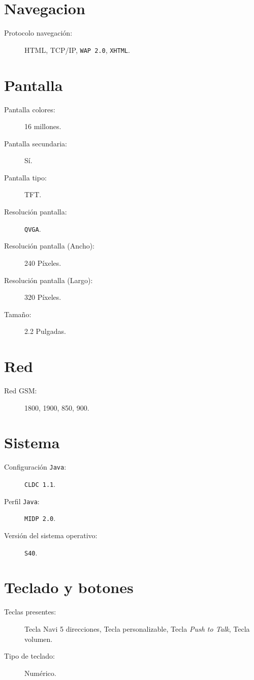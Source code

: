 \section{Navegacion}
\begin{description}
\item[Protocolo navegación:] \acs{HTML}, \acs{TCP}/\acs{IP},
\texttt{WAP 2.0}, \texttt{XHTML}.
\end{description}
\section{Pantalla}
\begin{description}
\item[Pantalla colores:] 16 millones.
\item[Pantalla secundaria:] Sí.
\item[Pantalla tipo:] \acs{TFT}.
\item[Resolución pantalla:] \texttt{QVGA}.
\item[Resolución pantalla (Ancho):] 240 Píxeles.
\item[Resolución pantalla (Largo):] 320 Píxeles.
\item[Tamaño:] 2.2 Pulgadas.
\end{description}
\section{Red}
\begin{description}
\item[Red \acs{GSM}:] 1800, 1900, 850, 900.
\end{description}
\section{Sistema}
\begin{description}
\item[Configuración \texttt{Java}:] \texttt{\acs{CLDC} 1.1}.
\item[Perfil \texttt{Java}:] \texttt{\acs{MIDP} 2.0}.
\item[Versión del sistema operativo:] \texttt{S40}.
\end{description}
\section{Teclado y botones}
\begin{description}
\item[Teclas presentes:] Tecla Navi 5 direcciones, Tecla personalizable, Tecla 
\emph{Push to Talk}, Tecla volumen.
\item[Tipo de teclado:] Numérico.
\end{description}
